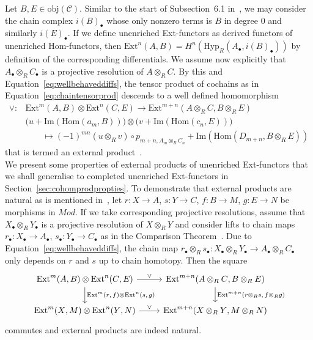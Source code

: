 \documentclass[12pt, a4paper]{article}
\numberwithin{equation}{section}
\theoremstyle{empty}
\theoremstyle{nonumberplain}
\begin{document}
Let $B, E \in \mathrm{obj}(\mathcal{C})$. Similar to the start of Subsection~6.1 in~\cite{ghe24}, we may consider the chain complex $i(B)_{\bullet}$ whose only nonzero terms is $B$ in degree $0$ and similarly $i(E)_{\bullet}$. If we define unenriched Ext-functors as derived functors of unenriched Hom-functors, then $\mathrm{Ext}^n(A, B) = H^n(\mathrm{Hyp}_R(A_{\bullet}, i(B)_{\bullet}))$ by definition of the corresponding differentials. We assume now explicitly that $A_{\bullet} \otimes_R C_{\bullet}$ is a projective resolution of $A \otimes_R C$. By this and Equation~\ref{eq:wellbehaveddiffs}, the tensor product of cochains as in Equation~\ref{eq:chaintensorprod} descends to a well defined homomorphism
\begin{align}
\vee: &\mathrm{Ext}^m(A, B) \otimes \mathrm{Ext}^n(C, E) \rightarrow \mathrm{Ext}^{m+n}(A \otimes_R C, B \otimes_R E) \nonumber \\
&\big(u + \mathrm{Im}(\mathrm{Hom}(a_m, B))\big) \otimes \big(v + \mathrm{Im}(\mathrm{Hom}(c_n, E))\big) \label{eq:ordinaryextprod} \\
&{} \qquad \mapsto (-1)^{mn} (u \otimes_R v) \circ p_{m+n, A_m \otimes_R C_n} + \mathrm{Im}(\mathrm{Hom}(D_{m+n}, B \otimes_R E)) \nonumber
\end{align}
that is termed an external product~\cite[p.~109--110]{bro82}. \\

We present some properties of external products of unenriched Ext-functors that we shall generalise to completed unenriched Ext-functors in Section~\ref{sec:cohomprodpropties}. To demonstrate that external products are natural as is mentioned in~\cite[p.~110]{bro82}, let $r: X \rightarrow A$, $s: Y \rightarrow C$, $f: B \rightarrow M$, $g: E \rightarrow N$ be morphisms in $Mod$. If we take corresponding projective resolutions, assume that $X_{\bullet} \otimes_R Y_{\bullet}$ is a projective resolution of $X \otimes_R Y$ and consider lifts to chain maps $r_{\bullet}: X_{\bullet} \rightarrow A_{\bullet}$, $s_{\bullet}: Y_{\bullet} \rightarrow C_{\bullet}$ as in the Comparison Theorem~\cite[Theorem~2.2.6]{wei94}. Due to Equation~\ref{eq:wellbehaveddiffs}, the chain map $r_{\bullet} \otimes_R s_{\bullet}: X_{\bullet} \otimes_R Y_{\bullet} \rightarrow A_{\bullet} \otimes_R C_{\bullet}$ only depends on $r$ and $s$ up to chain homotopy. Then the square
\begin{equation}\label{diag:extprodnat}
\begin{tikzcd}
    \mathrm{Ext}^m(A{,} \, B) \otimes \mathrm{Ext}^n(C{,} \, E) \arrow[r, "\vee"] \arrow[d, "\mathrm{Ext}^m(r{,} \, f) \otimes \mathrm{Ext}^n(s{,} \, g)"] & \mathrm{Ext}^{m+n}(A \otimes_R C{,} \, B \otimes_R E) \arrow[d, "\mathrm{Ext}^{m+n}(r \otimes_R s{,} \, f \otimes_R g)"] \\
    \mathrm{Ext}^m(X{,} \, M) \otimes \mathrm{Ext}^n(Y{,} \, N) \arrow[r, "\vee"] & \mathrm{Ext}^{m+n}(X \otimes_R Y{,} \, M \otimes_R N)
\end{tikzcd}
\end{equation}
commutes and external products are indeed natural. \\
\end{document}
